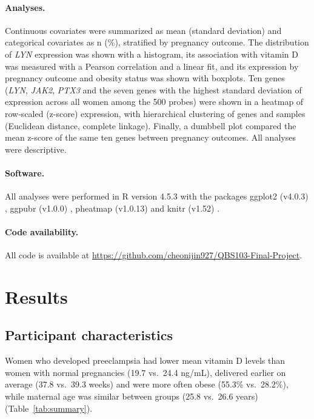 \documentclass[11pt]{article}
\begin{document}
\paragraph{Analyses.}
Continuous covariates were summarized as mean (standard deviation) and categorical covariates
as n (\%), stratified by pregnancy outcome. The distribution of \textit{LYN} expression was
shown with a histogram, its association with vitamin D was measured with a Pearson correlation
and a linear fit, and its expression by pregnancy outcome and obesity status was shown with
boxplots. Ten genes (\textit{LYN}, \textit{JAK2}, \textit{PTX3} and the seven genes with the
highest standard deviation of expression across all women among the 500 probes) were shown in a heatmap of
row-scaled (z-score) expression, with hierarchical clustering of genes and samples (Euclidean
distance, complete linkage). Finally, a dumbbell plot compared the mean z-score of the same ten
genes between pregnancy outcomes. All analyses were descriptive.

\paragraph{Software.}
All analyses were performed in R version 4.5.3 \cite{R2026} with the packages ggplot2
(v4.0.3) \cite{ggplot2}, ggpubr (v1.0.0) \cite{ggpubr}, pheatmap (v1.0.13) \cite{pheatmap}
and knitr (v1.52) \cite{knitr}.

\paragraph{Code availability.}
All code is available at \url{https://github.com/cheonijin927/QBS103-Final-Project}.

\section{Results}

\subsection{Participant characteristics}

Women who developed preeclampsia had lower mean vitamin D levels than women with normal
pregnancies (19.7 vs.\ 24.4 ng/mL), delivered earlier on average (37.8 vs.\ 39.3 weeks) and
were more often obese (55.3\% vs.\ 28.2\%), while maternal age was similar between groups
(25.8 vs.\ 26.6 years) (Table~\ref{tab:summary}).
\end{document}
